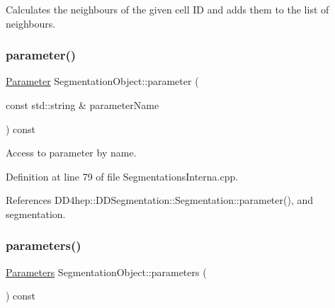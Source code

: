Calculates the neighbours of the given cell ID and adds them to the list of neighbours. 

\hypertarget{class_d_d4hep_1_1_geometry_1_1_segmentation_object_a707f9342c07bf61a61c73c19b24b981a}{}\label{class_d_d4hep_1_1_geometry_1_1_segmentation_object_a707f9342c07bf61a61c73c19b24b981a} 
\subsubsection{\texorpdfstring{parameter()}{parameter()}}
{\footnotesize\ttfamily \hyperlink{class_d_d4hep_1_1_geometry_1_1_segmentation_object_a0d017ffe7385b6fe44bf411386cc672b}{Parameter} Segmentation\+Object\+::parameter (\begin{DoxyParamCaption}\item[{const std\+::string \&}]{parameter\+Name }\end{DoxyParamCaption}) const}



Access to parameter by name. 



Definition at line 79 of file Segmentations\+Interna.\+cpp.



References D\+D4hep\+::\+D\+D\+Segmentation\+::\+Segmentation\+::parameter(), and segmentation.

\hypertarget{class_d_d4hep_1_1_geometry_1_1_segmentation_object_a5cfd3ee9527c7beeb571b1364990ada1}{}\label{class_d_d4hep_1_1_geometry_1_1_segmentation_object_a5cfd3ee9527c7beeb571b1364990ada1} 
\subsubsection{\texorpdfstring{parameters()}{parameters()}}
{\footnotesize\ttfamily \hyperlink{class_d_d4hep_1_1_geometry_1_1_segmentation_object_adb4bb039e0cd15ea9fbe0232d07c49cc}{Parameters} Segmentation\+Object\+::parameters (\begin{DoxyParamCaption}{ }\end{DoxyParamCaption}) const}



